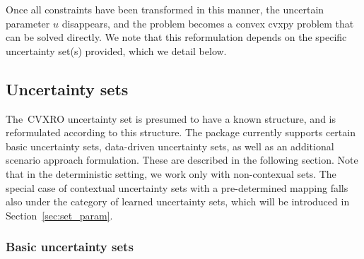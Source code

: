 Once all constraints have been transformed in this manner, the uncertain parameter $u$ disappears, and the problem becomes a convex cvxpy problem that can be solved directly.
We note that this reformulation depends on the specific uncertainty set(s) provided, which we detail below.


\subsection{Uncertainty sets}
\label{sec:uncertainty_sets}
The~\gls{CVXRO} uncertainty set is presumed to have a known structure, and is reformulated according to this structure. 
The package currently supports certain basic uncertainty sets, data-driven uncertainty sets, as well as an additional scenario approach formulation. These are described in the following section.
Note that in the deterministic setting, we work only with non-contexual sets. 
The special case of contextual uncertainty sets with a pre-determined mapping falls also under the category of learned uncertainty sets, which will be introduced in Section~\ref{sec:set_param}.
\subsubsection{Basic uncertainty sets}

